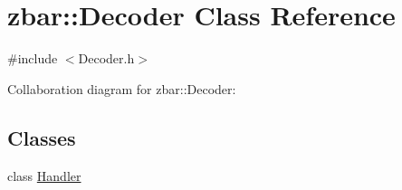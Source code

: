 \hypertarget{classzbar_1_1_decoder}{
\section{zbar::Decoder Class Reference}
\label{classzbar_1_1_decoder}
}


{\ttfamily \#include $<$Decoder.h$>$}



Collaboration diagram for zbar::Decoder:
\subsection*{Classes}
\begin{DoxyCompactItemize}
\item 
class \hyperlink{classzbar_1_1_decoder_1_1_handler}{Handler}
\end{DoxyCompactItemize}
